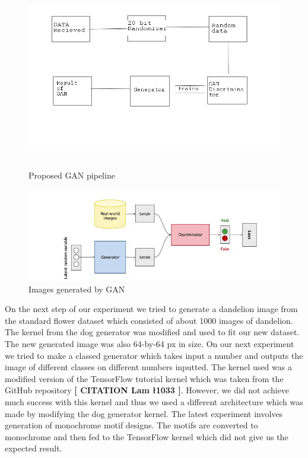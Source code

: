 \documentclass{article}
\begin{document}
    \begin{figure}[H]
        \centering
        \includegraphics[height=8cm]{images/GAN/Generalworkflow.png}
        \caption{Proposed GAN pipeline}
    \end{figure}
    
    \begin{figure}[H]
        \centering
        \includegraphics[scale=0.5]{images/GAN/basicGAN.png}
        \caption{Images generated by GAN}
    \end{figure}
    On the next step of our experiment we tried to generate a dandelion image from the standard flower dataset which consisted of about 1000 images of dandelion. The kernel from the dog generator was modified and used to fit our new dataset. The new generated image was also 64-by-64 px in size.
    On our next experiment we tried to make a classed generator which takes input a number and outputs the image of different classes on different numbers inputted. The kernel used was a modified version of the TensorFlow tutorial kernel which was taken from the GitHub repository \textbf{[ CITATION Lam \l 1033 ]}. However, we did not achieve much success with this kernel and thus we used a different architecture which was made by modifying the dog generator kernel.
    The latest experiment involves generation of monochrome motif designs. The motifs are converted to monochrome and then fed to the TensorFlow kernel which did not give us the expected result.
\end{document}
